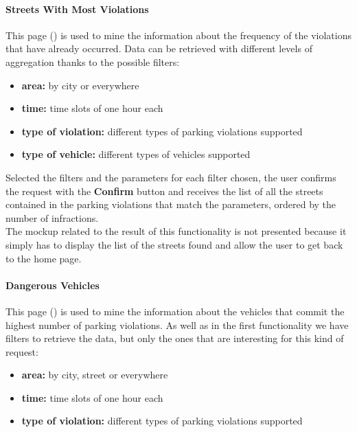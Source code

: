 			\paragraph{Streets With Most Violations}
			This page () is used to mine the information about the frequency of the violations that have already occurred. Data can be retrieved with different levels of aggregation thanks to the possible filters:
			
			\begin{itemize}
				\item \textbf{area:} by city or everywhere
				\item \textbf{time:} time slots of one hour each
				\item \textbf{type of violation:} different types of parking violations supported
				\item \textbf{type of vehicle:} different types of vehicles supported
			\end{itemize}
		
			Selected the filters and the parameters for each filter chosen, the user confirms the request with the \textbf{Confirm} button and receives the list of all the streets contained in the parking violations that match the parameters, ordered by the number of infractions.\\
			
			The mockup related to the result of this functionality is not presented because it simply has to display the list of the streets found and allow the user to get back to the home page.
			
			\paragraph{Dangerous Vehicles}
			This page () is used to mine the information about the vehicles that commit the highest number of parking violations. As well as in the first functionality we have filters to retrieve the data, but only the ones that are interesting for this kind of request:
			
			\begin{itemize}
				\item \textbf{area:} by city, street or everywhere
				\item \textbf{time:} time slots of one hour each
				\item \textbf{type of violation:} different types of parking violations supported
			\end{itemize}
		
